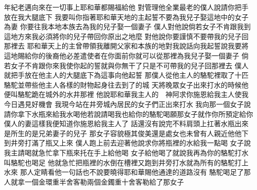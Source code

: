 \bchapter%
年紀老邁\chientien 向來在一切事上\chientien 耶和華都賜福給他\chuan 
{}對管理他全業最老的僕人說\chientien 請你把手放在我大腿底下\chuan 
{}我要叫你指著耶和華天地的主起誓\chientien 不要為我兒子娶這地中的女子為妻\chuan 
{}你要往我本地本族去\chientien 為我的兒子娶一個妻子\chuan 
{}僕人對他說\chientien 倘若女子不肯跟我到這地方來\chientien 我必須將你的兒子帶回你原出之地麼\chuan 
{}對他說\chientien 你要謹慎\chientien 不要帶我的兒子回那裡去\yuentien 
{}耶和華天上的主\chientien 曾帶領我離開父家和本族的地\chientien 對我說話向我起誓\chientien 說\chientien 我要將這地賜給你的後裔\yuentien 他必差遣使者在你面前\chientien 你就可以從那裡為我兒子娶一個妻子\chuan 
{}倘若女子不肯跟你來\chientien 我使你起的誓就與你無干了\chientien 只是不可帶我的兒子回那裡去\chuan 
{}僕人就把手放在他主人的大腿底下\chientien 為這事向他起誓\chuan\Chuan
{}那僕人從他主人的駱駝裡取了十匹駱駝\chientien 並帶些他主人各樣的財物\chientien 起身往去\chientien 到了的城\chuan 
{}天將晚\chientien 眾女子出來打水的時候\chientien 他便叫駱駝跪在城外的水井那裡\chuan 
{}他說\chientien 耶和華我主人的　神阿\chientien 求你施恩給我主人\chientien 使我今日遇見好機會\chuan 
{}我現今站在井旁\chientien 城內居民的女子們正出來打水\chuan 
{}我向那一個女子說\chientien 請你拿下水瓶來\chientien 給我水喝\chuan 他若說\chientien 請喝\chientien 我也給你的駱駝喝\chientien 願那女子就作你所預定給你僕人的妻\chientien 這樣\chientien 我便知道你施恩給我主人了\chuan 
{}話還沒有說完\chientien 不料\chientien{}肩頭上扛著水瓶出來\chientien{}是所生的\chientien{}是兄弟妻子的兒子\chuan 
{}那女子容貌極其俊美\chientien 還是處女\chientien 也未曾有人親近他\chientien 他下到井旁打滿了瓶\chientien 又上來\yuentien 
{}僕人跑上前去迎著他說\chientien 求你將瓶裡的水給我一點喝\chuan 
{}女子說\chientien 我主請喝\yuentien 就急忙拿下瓶來\chientien 托在手上給他喝\chuan 
{}女子給他喝了\chientien 就說\chientien 我再為你的駱駝打水\chientien 叫駱駝也喝足\chuan 
{}他就急忙把瓶裡的水倒在槽裡\chientien 又跑到井旁打水\chientien 就為所有的駱駝打上水來\chuan 
{}那人定睛看他\chientien 一句話也不說\chientien 要曉得耶和華賜他通達的道路沒有\chuan 
{}駱駝喝足了\chientien 那人就拿一個金環\chientien 重半舍客勒\chientien 兩個金鐲\chientien 重十舍客勒\chientien 給了那女子\chientien 
